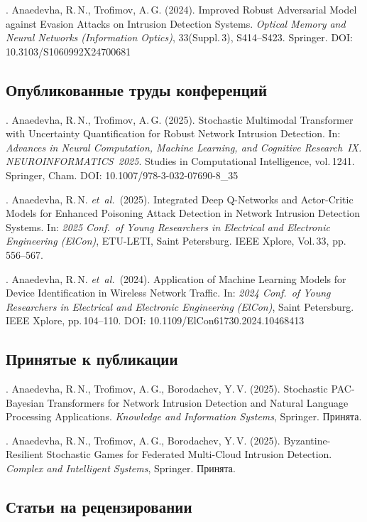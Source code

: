 . Anaedevha, R.\,N., Trofimov, A.\,G. (2024). Improved Robust Adversarial Model against Evasion Attacks on Intrusion Detection Systems. \textit{Optical Memory and Neural Networks (Information Optics)}, 33(Suppl.\,3), S414--S423. Springer. DOI: 10.3103/S1060992X24700681

\subsection*{Опубликованные труды конференций}

. Anaedevha, R.\,N., Trofimov, A.\,G. (2025). Stochastic Multimodal Transformer with Uncertainty Quantification for Robust Network Intrusion Detection. In: \textit{Advances in Neural Computation, Machine Learning, and Cognitive Research~IX. NEUROINFORMATICS~2025}. Studies in Computational Intelligence, vol.\,1241. Springer, Cham. DOI: 10.1007/978-3-032-07690-8\_35

. Anaedevha, R.\,N. \textit{et~al.}\ (2025). Integrated Deep Q-Networks and Actor-Critic Models for Enhanced Poisoning Attack Detection in Network Intrusion Detection Systems. In: \textit{2025 Conf.\ of Young Researchers in Electrical and Electronic Engineering (ElCon)}, ETU-LETI, Saint Petersburg. IEEE Xplore, Vol.\,33, pp.\,556--567.

. Anaedevha, R.\,N. \textit{et~al.}\ (2024). Application of Machine Learning Models for Device Identification in Wireless Network Traffic. In: \textit{2024 Conf.\ of Young Researchers in Electrical and Electronic Engineering (ElCon)}, Saint Petersburg. IEEE Xplore, pp.\,104--110. DOI: 10.1109/ElCon61730.2024.10468413

\subsection*{Принятые к публикации}

. Anaedevha, R.\,N., Trofimov, A.\,G., Borodachev, Y.\,V. (2025). Stochastic PAC-Bayesian Transformers for Network Intrusion Detection and Natural Language Processing Applications. \textit{Knowledge and Information Systems}, Springer. Принята.

. Anaedevha, R.\,N., Trofimov, A.\,G., Borodachev, Y.\,V. (2025). Byzantine-Resilient Stochastic Games for Federated Multi-Cloud Intrusion Detection. \textit{Complex and Intelligent Systems}, Springer. Принята.

\subsection*{Статьи на рецензировании}


